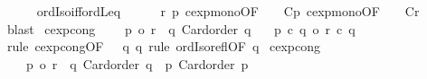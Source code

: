 \begin{isabellebody}
\ {}\ {}\ {}\ \isamarkupfalse%
\ ordIso{\isacharunderscore}{\kern0pt}iff{\isacharunderscore}{\kern0pt}ordLeq\isanewline
\ \ \ \ \isamarkupfalse%
\ r\ p\ cexp{\isacharunderscore}{\kern0pt}mono{\isacharbrackleft}{\kern0pt}OF\ {\isacharunderscore}{\kern0pt}\ {\isacharunderscore}{\kern0pt}\ {\isacharunderscore}{\kern0pt}\ Cp{\isacharbrackright}{\kern0pt}\ cexp{\isacharunderscore}{\kern0pt}mono{\isacharbrackleft}{\kern0pt}OF\ {\isacharunderscore}{\kern0pt}\ {\isacharunderscore}{\kern0pt}\ {\isacharunderscore}{\kern0pt}\ Cr{\isacharbrackright}{\kern0pt}\ \isamarkupfalse%
\ blast\isanewline
{}\isamarkupfalse%
%
\endisatagproof
{\isafoldproof}%
%
\isadelimproof
\isanewline
%
\endisadelimproof
\isanewline
{}\isamarkupfalse%
\ cexp{\isacharunderscore}{\kern0pt}cong{}{\isacharcolon}{\kern0pt}\isanewline
\ \ \ {}{\isacharcolon}{\kern0pt}\ {\isachardoublequoteopen}p{}\ {\isacharequal}{\kern0pt}o\ r{}{\isachardoublequoteclose}\ \ q{\isacharcolon}{\kern0pt}\ {\isachardoublequoteopen}Card{\isacharunderscore}{\kern0pt}order\ q{\isachardoublequoteclose}\isanewline
\ \ \ {\isachardoublequoteopen}p{}\ {\isacharcircum}{\kern0pt}c\ q\ {\isacharequal}{\kern0pt}o\ r{}\ {\isacharcircum}{\kern0pt}c\ q{\isachardoublequoteclose}\isanewline
%
\isadelimproof
%
\endisadelimproof
%
\isatagproof
{}\isamarkupfalse%
\ {\isacharparenleft}{\kern0pt}rule\ cexp{\isacharunderscore}{\kern0pt}cong{\isacharbrackleft}{\kern0pt}OF\ {}\ {\isacharunderscore}{\kern0pt}\ q\ q{\isacharbrackright}{\kern0pt}{\isacharparenright}{\kern0pt}\ {\isacharparenleft}{\kern0pt}rule\ ordIso{\isacharunderscore}{\kern0pt}refl{\isacharbrackleft}{\kern0pt}OF\ q{\isacharbrackright}{\kern0pt}{\isacharparenright}{\kern0pt}%
\endisatagproof
{\isafoldproof}%
%
\isadelimproof
\isanewline
%
\endisadelimproof
\isanewline
{}\isamarkupfalse%
\ cexp{\isacharunderscore}{\kern0pt}cong{}{\isacharcolon}{\kern0pt}\isanewline
\ \ \ {}{\isacharcolon}{\kern0pt}\ {\isachardoublequoteopen}p{}\ {\isacharequal}{\kern0pt}o\ r{}{\isachardoublequoteclose}\ \ q{\isacharcolon}{\kern0pt}\ {\isachardoublequoteopen}Card{\isacharunderscore}{\kern0pt}order\ q{\isachardoublequoteclose}\ \ p{\isacharcolon}{\kern0pt}\ {\isachardoublequoteopen}Card{\isacharunderscore}{\kern0pt}order\ p{}{\isachardoublequoteclose}\isanewline

\end{isabellebody}
